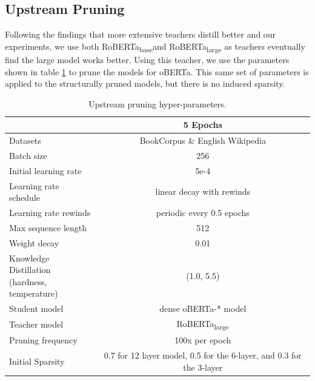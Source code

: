 \subsection{Upstream Pruning}
Following the findings that more extensive teachers distill better \cite{Liu2019RoBERTaAR} and our experiments, we use both RoBERTa\textsubscript{base}and RoBERTa\textsubscript{large} as teachers eventually find the large model works better. Using this teacher, we use the parameters shown in table \ref{tab:hyperparams-UpstreamPruning} to prune the models for oBERTa. This same set of parameters is applied to the structurally pruned models, but there is no induced sparsity. 
\begin{table}
      \centering
         {\small 
            \begin{tabular}{l|c}
            \toprule
            & 5 Epochs \\
            \midrule
            Datasets & BookCorpus \& English Wikipedia \\
            \midrule
            Batch size & 256 \\
            \midrule
            Initial learning rate & 5e-4 \\
            Learning rate schedule & linear decay with rewinds \\
            Learning rate rewinds & periodic every 0.5 epochs \\
            \midrule
            Max sequence length & 512 \\
            Weight decay & 0.01 \\
            \midrule
            \makecell{Knowledge Distillation\\(hardness, temperature)} & (1.0, 5.5) \\
            \midrule
            Student model & dense oBERTa-* model \\
            Teacher model & RoBERTa\textsubscript{large} \\
            \midrule
            Pruning frequency & 100x per epoch \\
            \bottomrule
            \midrule
            Initial Sparsity & 0.7 for 12 layer model, 0.5 for the 6-layer, and 0.3 for the 3-layer \\
            \bottomrule
            \end{tabular}
        }
            \caption{Upstream pruning hyper-parameters.}
            \label{tab:hyperparams-UpstreamPruning}
\end{table}
